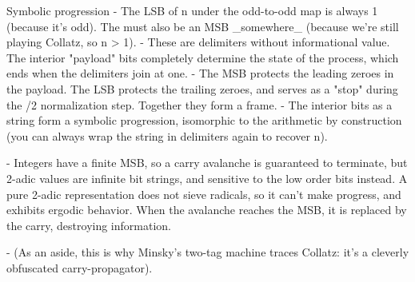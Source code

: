 \documentclass[12pt]{article}
\theoremstyle{plain}
\theoremstyle{definition}
\begin{document}
Symbolic progression
- The LSB of n under the odd-to-odd map is always 1 (because it's odd). The must also be an MSB _somewhere_ (because we're still playing Collatz, so n > 1).
- These are delimiters without informational value. The interior "payload" bits completely determine the state of the process, which ends when the delimiters join at one.
- The MSB protects the leading zeroes in the payload. The LSB protects the trailing zeroes, and serves as a "stop" during the /2 normalization step. Together they form a frame.
- The interior bits as a string form a symbolic progression, isomorphic to the arithmetic by construction (you can always wrap the string in delimiters again to recover n).


- Integers have a finite MSB, so a carry avalanche is guaranteed to terminate, but 2-adic values are infinite bit strings, and sensitive to the low order bits instead. A pure 2-adic representation does not sieve radicals, so it can't make progress, and exhibits ergodic behavior. When the avalanche reaches the MSB, it is replaced by the carry, destroying information.

- (As an aside, this is why Minsky's two-tag machine traces Collatz: it's a cleverly obfuscated carry-propagator).



\begin{thebibliography}{9}

\end{thebibliography}
\end{document}
